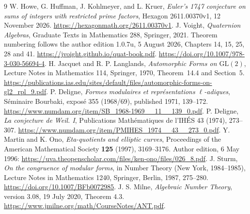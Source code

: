 \begin{thebibliography}{9}\footnotesize
{} W. Howe, G. Huffman, J. Kohlmeyer, and L. Kruer,
\emph{Euler's 1747 conjecture on sums of integers with restricted prime
factors}, Hexagon 2611.00370v1, 12 November 2026.
\url{https://hexagonmath.org/2611.00370v1}.
 J. Voight, \emph{Quaternion Algebras}, Graduate Texts in
Mathematics 288, Springer, 2021. Theorem numbering follows the author edition
1.0.7u, 5 August 2026, Chapters 14, 15, 25, 28 and 41.
\url{https://jvoight.github.io/quat-book.pdf}.
\url{https://doi.org/10.1007/978-3-030-56694-4}.
 H. Jacquet and R. P. Langlands,
\emph{Automorphic Forms on $\mathrm{GL}(2)$}, Lecture Notes in Mathematics
114, Springer, 1970, Theorem~14.4 and Section~5.
\url{https://publications.ias.edu/sites/default/files/automorphic-forms-on-gl2_rpl_9.pdf}.
 P. Deligne,
\emph{Formes modulaires et repr\'esentations $\ell$-adiques},
S\'eminaire Bourbaki, expos\'e 355 (1968/69), published 1971, 139--172.
\url{https://www.numdam.org/item/SB_1968-1969__11__139_0.pdf}.
 P. Deligne, \emph{La conjecture de Weil. I},
Publications Math\'ematiques de l'IH\'ES 43 (1974), 273--307.
\url{https://www.numdam.org/item/PMIHES_1974__43__273_0.pdf}.
 Y. Martin and K. Ono,
\emph{Eta-quotients and elliptic curves}, Proceedings of the American
Mathematical Society \textbf{125} (1997), 3169--3176.
Author edition, 6 May 1996:
\url{https://uva.theopenscholar.com/files/ken-ono/files/026_8.pdf}.
 J. Sturm,
\emph{On the congruence of modular forms}, in Number Theory
(New York, 1984--1985), Lecture Notes in Mathematics 1240,
Springer, Berlin, 1987, 275--280.
\url{https://doi.org/10.1007/BFb0072985}.
 J. S. Milne,
\emph{Algebraic Number Theory}, version 3.08, 19 July 2020,
Theorem 4.3. \url{https://www.jmilne.org/math/CourseNotes/ANT.pdf}.
\end{thebibliography}

